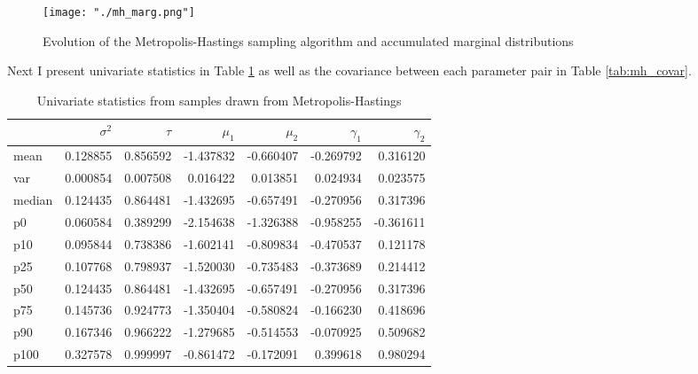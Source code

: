 \documentclass{article}
\begin{document}
\begin{figure}[H]
  \centering
  \texttt{[image: "./mh\_marg.png"]}
  \caption{\label{fig:mh_marg} Evolution of the Metropolis-Hastings sampling algorithm and accumulated marginal distributions}
\end{figure}

Next I present univariate statistics in Table \ref{tab:mh_univar} as well as the covariance between each parameter pair in Table \ref{tab:mh_covar}. 

\begin{table}[H]
  \begin{center}
    \begin{tabular}{lrrrrrr}
      {} &$\sigma^2$ & $\tau$ & $\mu_1$ & $\mu_2$ & $\gamma_1$ & $\gamma_2$ \\
      \midrule
      mean   &  0.128855 &  0.856592 & -1.437832 & -0.660407 & -0.269792 &  0.316120 \\
      var    &  0.000854 &  0.007508 &  0.016422 &  0.013851 &  0.024934 &  0.023575 \\
      median &  0.124435 &  0.864481 & -1.432695 & -0.657491 & -0.270956 &  0.317396 \\
      p0     &  0.060584 &  0.389299 & -2.154638 & -1.326388 & -0.958255 & -0.361611 \\
      p10    &  0.095844 &  0.738386 & -1.602141 & -0.809834 & -0.470537 &  0.121178 \\
      p25    &  0.107768 &  0.798937 & -1.520030 & -0.735483 & -0.373689 &  0.214412 \\
      p50    &  0.124435 &  0.864481 & -1.432695 & -0.657491 & -0.270956 &  0.317396 \\
      p75    &  0.145736 &  0.924773 & -1.350404 & -0.580824 & -0.166230 &  0.418696 \\
      p90    &  0.167346 &  0.966222 & -1.279685 & -0.514553 & -0.070925 &  0.509682 \\
      p100   &  0.327578 &  0.999997 & -0.861472 & -0.172091 &  0.399618 &  0.980294 \\
      \bottomrule
      \end{tabular}
  \end{center}
  \caption{\label{tab:mh_univar} Univariate statistics from samples drawn from Metropolis-Hastings}
\end{table}
\end{document}
